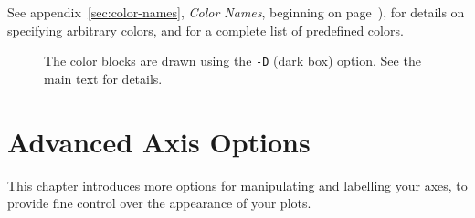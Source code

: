\documentclass{book}
\begin{document}
See appendix~\ref{sec:color-names}, {\em Color Names}, beginning on
page~\pageref{sec:color-names}), for details on specifying arbitrary
colors, and for a complete list of predefined colors.

\begin{figure}
\begin{center}
\end{center}
\caption[Using color in plots]{The color blocks are drawn using the {\tt -D}
(dark box) option.  See the main text for details. \label{fig:colors}}
\end{figure}

\chapter{Advanced Axis Options \label{sec:ax2}}

This chapter introduces more options for manipulating and labelling
your axes, to provide fine control over the appearance of your plots.
\end{document}
